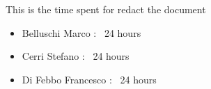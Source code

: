 This is the time spent for redact the document
\begin{itemize}
	\item Belluschi Marco : ~24 hours
	\item Cerri Stefano : ~24 hours
	\item Di Febbo Francesco : ~24 hours
\end{itemize}